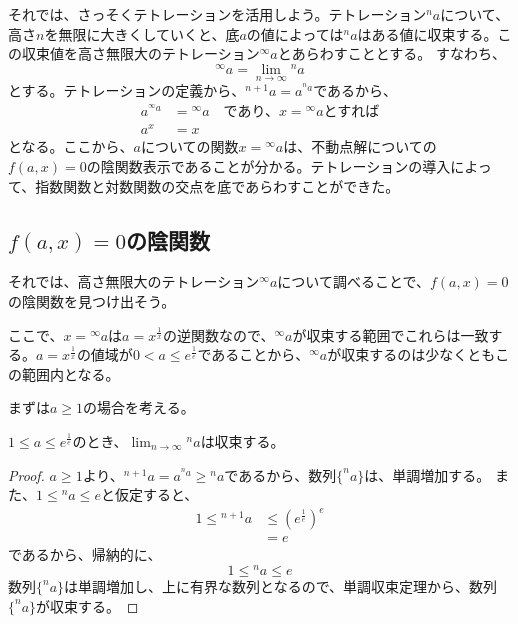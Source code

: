 	それでは、さっそくテトレーションを活用しよう。テトレーション$^n a$について、高さ$n$を無限に大きくしていくと、底$a$の値によっては$^n a$はある値に収束する。この収束値を高さ無限大のテトレーション$^\infty a$とあらわすこととする。
	すなわち、
	\begin{equation*}
		^\infty a = \lim_{n \to \infty} {^n a}
	\end{equation*}
	とする。テトレーションの定義から、$^{n+1} a = a^{^n a}$であるから、
	\begin{align*}
		a ^{^\infty a} &= {^\infty a} \quad \text{であり、$x = {^\infty a}$とすれば} \\
		a^x &= x
	\end{align*}
	となる。ここから、$a$についての関数$x = {^\infty a}$は、不動点解についての$f(a,x) = 0$の陰関数表示であることが分かる。テトレーションの導入によって、指数関数と対数関数の交点を底であらわすことができた。
	
\subsection{$f(a,x)=0$の陰関数}
	それでは、高さ無限大のテトレーション$^\infty a$について調べることで、$f(a,x)=0$の陰関数を見つけ出そう。
	
	ここで、$x = {^\infty a}$は$a = x^\frac{1}{x}$の逆関数なので、${^\infty a}$が収束する範囲でこれらは一致する。$a = x^\frac{1}{x}$の値域が$0 < a \leq e^\frac{1}{e}$であることから、${^\infty a}$が収束するのは少なくともこの範囲内となる。
	
	まずは$a \geq 1$の場合を考える。
	\begin{theorem}
	\label{th:tetration_convergence_a_greater_1}
		$1 \leq a \leq e^\frac{1}{e}$のとき、$\displaystyle \lim_{n \to \infty} {^n a}$は収束する。
	\end{theorem}
	\begin{proof}
	
		$a \geq 1$より、$^{n+1} a = a ^{^n a} \geq {^n a}$であるから、数列$\{^n a\}$は、単調増加する。
		また、$1 \leq {^n a} \leq e$と仮定すると、
		\begin{align*}
			1 \leq {^{n+1} a} &\leq \left( e^\frac{1}{e} \right)^e \\
							  &= e
		\end{align*}
		であるから、帰納的に、
		\begin{equation*}
			1 \leq {^n a} \leq e
		\end{equation*}
		数列$\{^n a\}$は単調増加し、上に有界な数列となるので、単調収束定理から、数列$\{^n a\}$が収束する。
	\end{proof}
	
